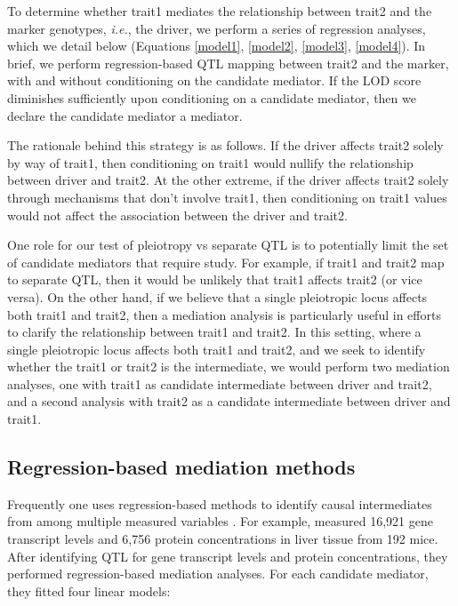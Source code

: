 \documentclass{article}
\begin{document}
\begin{boehm}
To determine whether trait1 mediates the relationship between trait2 and the marker genotypes, \emph{i.e.}, the driver, we perform a series of regression analyses, which we detail below (Equations \ref{model1}, \ref{model2}, \ref{model3}, \ref{model4}). In brief, we perform regression-based QTL mapping between trait2 and the marker, with and without conditioning on the candidate mediator. If the LOD score diminishes sufficiently upon conditioning on a candidate mediator, then we declare the candidate mediator a mediator.

The rationale behind this strategy is as follows. If the driver affects trait2 solely by way of trait1, then conditioning on trait1 would nullify the relationship between driver and trait2. At the other extreme, if the driver affects trait2 solely through mechanisms that don't involve trait1, then conditioning on trait1 values would not affect the association between the driver and trait2.

One role for our test of pleiotropy vs separate QTL is to potentially limit the set of candidate mediators that require study. For example, if trait1 and trait2 map to separate QTL, then it would be unlikely that trait1 affects trait2 (or vice versa). On the other hand, if we believe that a single pleiotropic locus affects both trait1 and trait2, then a mediation analysis is particularly useful in efforts to clarify the relationship between trait1 and trait2. In this setting, where a single pleiotropic locus affects both trait1 and trait2, and we seek to identify whether the trait1 or trait2 is the intermediate, we would perform two mediation analyses, one with trait1 as candidate intermediate between driver and trait2, and a second analysis with trait2 as a candidate intermediate between driver and trait1.

\subsection{Regression-based mediation methods}

Frequently one uses regression-based methods to identify causal intermediates from among multiple measured variables \citep{baron1986moderator}. For example, \citet{chick2016defining} measured 16,921 gene transcript levels and 6,756 protein concentrations in liver tissue from 192 mice. After identifying QTL for gene transcript levels and protein concentrations, they performed regression-based mediation analyses. For each candidate mediator, they fitted four linear models:


\end{boehm}
\end{document}
